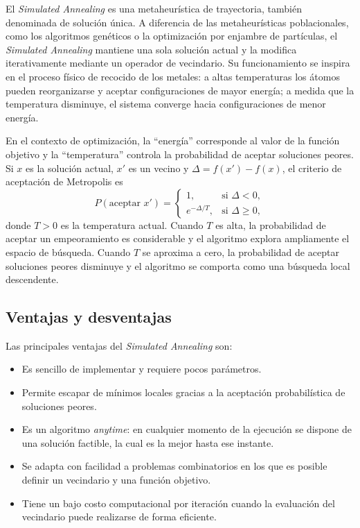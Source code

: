 El \emph{Simulated Annealing} es una metaheurística de trayectoria, también denominada de solución única.
A diferencia de las metaheurísticas poblacionales,
como los algoritmos genéticos o la optimización por enjambre de partículas,
el \emph{Simulated Annealing} mantiene una sola solución actual y
la modifica iterativamente mediante un operador de vecindario.
Su funcionamiento se inspira en el proceso físico de recocido de los metales:
a altas temperaturas los átomos pueden reorganizarse y aceptar configuraciones de mayor energía;
a medida que la temperatura disminuye, el sistema converge hacia configuraciones de menor energía.

En el contexto de optimización, la ``energía'' corresponde al valor de la función objetivo
y la ``temperatura'' controla la probabilidad de aceptar soluciones peores.
Si \(x\) es la solución actual, \(x'\) es un vecino y \(\Delta = f(x') - f(x)\),
el criterio de aceptación de Metropolis es
\[
    P(\text{aceptar } x') =
    \begin{cases}
        1, & \text{si } \Delta < 0, \\[0.2cm]
        e^{-\Delta/T}, & \text{si } \Delta \ge 0,
    \end{cases}
\]
donde \(T>0\) es la temperatura actual.
Cuando \(T\) es alta, la probabilidad de aceptar un empeoramiento es considerable y
el algoritmo explora ampliamente el espacio de búsqueda. Cuando \(T\) se aproxima a cero,
la probabilidad de aceptar soluciones peores disminuye y el algoritmo se comporta como una búsqueda local descendente.

\subsection{Ventajas y desventajas}

Las principales ventajas del \emph{Simulated Annealing} son:

\begin{itemize}
    \item Es sencillo de implementar y requiere pocos parámetros.
    \item Permite escapar de mínimos locales gracias a la aceptación probabilística de soluciones peores.
    \item Es un algoritmo \emph{anytime}: en cualquier momento de la ejecución se dispone de una solución factible, la cual es la mejor hasta ese instante.
    \item Se adapta con facilidad a problemas combinatorios en los que es posible definir un vecindario y una función objetivo.
    \item Tiene un bajo costo computacional por iteración cuando la evaluación del vecindario puede realizarse de forma eficiente.
\end{itemize}

